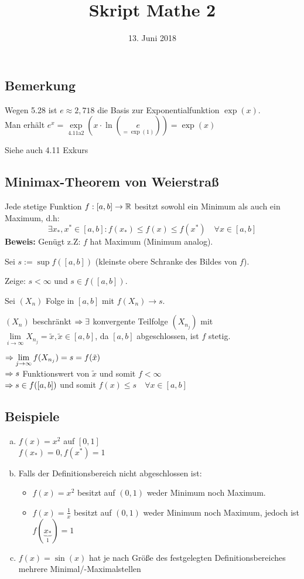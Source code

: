 \documentclass[10pt, a4paper, fleqn]{article}
\begin{document}
    \title{Skript Mathe 2}
    \date{13. Juni 2018}
    \maketitle
\fi
\subsection{Bemerkung}
Wegen 5.28 ist $e \approx 2,718$ die Basis zur Exponentialfunktion $\exp(x)$. \\
Man erhält $e^x = \underset{\text{4.11a2}}{\exp}(x \cdot \ln(\underset{= \exp(1)}{e})) = \exp(x)$

Siehe auch 4.11 Exkurs

\subsection{Minimax-Theorem von Weierstraß}

Jede stetige Funktion $f: [a, b] \to \mathbb{R}$ besitzt sowohl ein Minimum als auch ein Maximum,
d.h:
\[
    \exists x_*, x^* \in [a, b]: f(x_*) \leq f(x) \leq f(x^*) \quad \forall x \in [a, b]    
\]
\textbf{Beweis: } Genügt z.Z: $f$ hat Maximum (Minimum analog).

Sei $s := \sup f([a, b])$ (kleinste obere Schranke des Bildes von $f$).

Zeige: $s < \infty$ und $s \in f([a, b])$.

Sei $(X_n)$ Folge in $[a, b]$ mit $f(X_n) \to s$.

$(X_n)$ beschränkt $\Rightarrow \exists$ konvergente Teilfolge $(X_{n_j})$ mit
$\lim\limits_{i \to \infty} X_{n_j} = \tilde{x}, \tilde{x} \in [a, b]$, da
$[a, b]$ abgeschlossen, ist $f$ stetig.

$\Rightarrow \lim\limits_{j \to \infty} f(X_{n_j}) = s = f(\tilde{x})$ \\
$\Rightarrow s$ Funktionswert von $\tilde{x}$ und somit $f < \infty$ \\
$\Rightarrow s \in f([a, b])$ und somit $f(x) \leq s \quad \forall x \in [a, b]$

\subsection{Beispiele}
\begin{enumerate}[a)]
    \item $f(x) = x^2$ auf $[0, 1]$ \\
    $f(x_*) = 0, f(x^*) = 1$

    \item Falls der Definitionsbereich nicht abgeschlossen ist:
    \begin{itemize}
        \item $f(x) = x^2$ besitzt auf $(0, 1)$ weder Minimum noch Maximum.
        \item $f(x) = \frac{1}{x}$ besitzt auf $(0, 1)$ weder Minimum noch Maximum,
        jedoch ist $f(\underbrace{x_*}_{1}) = 1$
    \end{itemize}
    \item $f(x) = \sin(x)$ hat je nach Größe des festgelegten Definitionsbereiches mehrere
    Minimal/-Maximalstellen
\end{enumerate}
\end{document}
